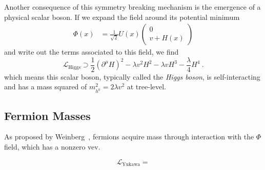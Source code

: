 Another consequence of this symmetry breaking mechanism is the
emergence of a physical scalar boson. If we expand the field around
its potential minimum
\begin{align}
\Phi(x)&=
\frac{1}{\sqrt{2}}U(x)\left(\begin{matrix} 0\\v+H(x)\end{matrix} \right)
\end{align}
and write out the terms associated to this field, we find
\begin{equation}
\mathcal L_{\mathrm{Higgs}} \supset \frac{1}{2}(\partial^{\mu}H)^2 -
\lambda v^2 H^2 - \lambda v H^3 - \frac{\lambda}{4}H^4~.
\end{equation}
which means this scalar boson, typically called the
\emph{Higgs boson}, is self-interacting and has a mass squared of $m^2_{h^0} =
2\lambda v^2$ at tree-level.

\subsection{Fermion Masses}
As proposed by Weinberg~\cite{PhysRevLett.19.1264}, fermions acquire
mass through interaction with the $\Phi$ field, which has a nonzero
vev.

\begin{equation}
\mathcal L_{\mathrm{Yukawa}} =
\end{equation}

